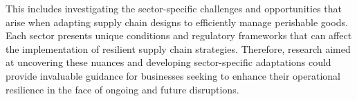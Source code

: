 This includes investigating the sector-specific challenges and opportunities that arise when adapting supply chain designs to efficiently manage perishable goods. Each sector presents unique conditions and regulatory frameworks that can affect the implementation of resilient supply chain strategies. Therefore, research aimed at uncovering these nuances and developing sector-specific adaptations could provide invaluable guidance for businesses seeking to enhance their operational resilience in the face of ongoing and future disruptions.





